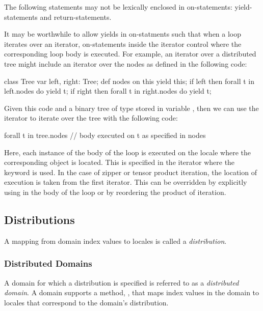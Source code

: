 The following statements may not be lexically enclosed in
on-statements: yield-statements and return-statements.

\begin{openissue}
It may be worthwhile to allow yields in on-statments such that when a
loop iterates over an iterator, on-statements inside the iterator
control where the corresponding loop body is executed.  For example,
an iterator over a distributed tree might include an iterator over the
nodes as defined in the following code:
\begin{chapel}
class Tree {
  var left, right: Tree;
  def nodes {
    on this yield this;
    if left then
      forall t in left.nodes do
        yield t;
    if right then
      forall t in right.nodes do
        yield t;
  }
}
\end{chapel}
Given this code and a binary tree of type  stored in
variable , then we can use the  iterator to
iterate over the tree with the following code:
\begin{chapel}
forall t in tree.nodes {
  // body executed on t as specified in nodes
}
\end{chapel}
Here, each instance of the body of the  loop is executed
on the locale where the corresponding object  is located.
This is specified in the  iterator where the 
keyword is used.  In the case of zipper or tensor product iteration,
the location of execution is taken from the first iterator.  This can
be overridden by explicitly using  in the body of the loop or
by reordering the product of iteration.
\end{openissue}

\subsection{Distributions}
\label{Distributions}

A mapping from domain index values to locales is called a {\em
distribution}.

\subsubsection{Distributed Domains}
\label{Distributed_Domains}

A domain for which a distribution is specified is referred to as a
{\em distributed domain}.  A domain supports a method, ,
that maps index values in the domain to locales that correspond to the
domain's distribution.

